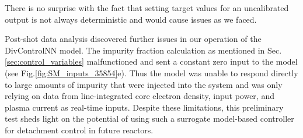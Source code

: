 There is no surprise with the fact that setting target values for an uncalibrated output is not always deterministic and would cause issues as we faced.

Post-shot data analysis discovered further issues in our operation of the DivControlNN model.
The impurity fraction calculation as mentioned in Sec.\ref{sec:control_variables} malfunctioned and sent a constant zero input to the model (see Fig.\ref{fig:SM_inputs_35854}e).
Thus the model was unable to respond directly to large amounts of impurity that were injected into the system and was only relying on data from line-integrated core electron density, input power, and plasma current as real-time inputs.
Despite these limitations, this preliminary test sheds light on the potential of using such a surrogate model-based controller for detachment control in future reactors.

